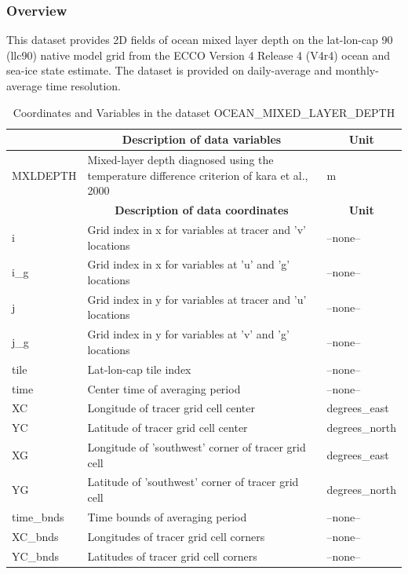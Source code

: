 \subsubsection{Overview}
This dataset provides 2D fields of ocean mixed layer depth on the lat-lon-cap 90 (llc90) native model grid from the ECCO Version 4 Release 4 (V4r4) ocean and sea-ice state estimate. The dataset is provided on daily-average and monthly-average time resolution. 
\begin{longtable}{|m{}|m{}|m{}|}
\caption{Coordinates and Variables in the dataset OCEAN\_MIXED\_LAYER\_DEPTH}
\label{tab:table-OCEAN_MIXED_LAYER_DEPTH-fields} \\ 
\hline \endhead \hline \endfoot
\rowcolor{lightgray} \multicolumn{1}{|c|}{\textbf{Variables}} & \multicolumn{1}{|c|}{\textbf{Description of data variables}} &  \multicolumn{1}{|c|}{\textbf{Unit}}\\ \hline
MXLDEPTH &Mixed-layer depth diagnosed using the temperature difference criterion of kara et al., 2000 &m  \\ \hline
\rowcolor{lightgray} \multicolumn{1}{|c|}{\textbf{Coordinates}} & \multicolumn{1}{|c|}{\textbf{Description of data coordinates}} &  \multicolumn{1}{|c|}{\textbf{Unit}}\\ \hline
i &Grid index in x for variables at tracer and 'v' locations &--none--  \\ \hline
i\_g &Grid index in x for variables at 'u' and 'g' locations &--none--  \\ \hline
j &Grid index in y for variables at tracer and 'u' locations &--none--  \\ \hline
j\_g &Grid index in y for variables at 'v' and 'g' locations &--none--  \\ \hline
tile &Lat-lon-cap tile index &--none--  \\ \hline
time &Center time of averaging period &--none--  \\ \hline
XC &Longitude of tracer grid cell center &degrees\_east  \\ \hline
YC &Latitude of tracer grid cell center &degrees\_north  \\ \hline
XG &Longitude of 'southwest' corner of tracer grid cell &degrees\_east  \\ \hline
YG &Latitude of 'southwest' corner of tracer grid cell &degrees\_north  \\ \hline
time\_bnds &Time bounds of averaging period &--none--  \\ \hline
XC\_bnds &Longitudes of tracer grid cell corners &--none--  \\ \hline
YC\_bnds &Latitudes of tracer grid cell corners &--none--  \\ \hline
\end{longtable}

